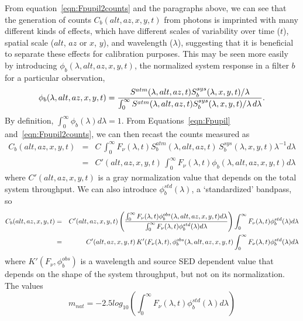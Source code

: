 \documentclass[12pt,preprint]{aastex}
\begin{document}
From equation~\ref{eqn:Fpupil2counts} and the paragraphs above, we can
see that the generation of counts $C_b(alt,az,x,y,t)$ from photons is
imprinted with many different kinds of effects, which have different
scales of variability over time ($t$), spatial scale ($alt$, $az$ or
$x$, $y$), and wavelength ($\lambda$), suggesting that it is
beneficial to separate these effects for calibration
purposes. This may be
seen more easily by introducing $\phi_b(\lambda,alt,az,x,y,t)$, the normalized system
response in a filter $b$ for a particular observation,
\begin{equation}
\label{eqn:PhiDef}
   \phi_b(\lambda,alt,az,x,y,t) = {
     {S^{atm}(\lambda,alt,az,t) S_b^{sys}(\lambda,x,y,t) \slash
       \lambda} \over
     \int_0^\infty { {S^{atm}(\lambda,alt,az,t) 
         S_b^{sys}(\lambda,x,y,t) \slash \lambda} \,d\lambda}}.
\end{equation}
By definition, $\int_0^\infty {\phi_b(\lambda) d\lambda}=1$.  From
Equations~\ref{eqn:Fpupil} and~\ref{eqn:Fpupil2counts}, we can then
recast the counts measured as
\begin{eqnarray}
\label{eqn:fullcounts}
C_b(alt,az,x,y,t) & = & C \, \int_0^\infty {F_\nu(\lambda,t)
  S_b^{atm}(\lambda,alt,az,t) \, S_b^{sys}(\lambda,x,y,t)
  \lambda^{-1}d\lambda} \\
&= & C'(alt,az,x,y,t) \,
     \int_0^\infty {F_\nu(\lambda,t)\phi_b(\lambda,alt,az,x,y,t)
       d\lambda} 
\end{eqnarray}
where $C'(alt,az,x,y,t)$ is a gray normalization value that depends
on the total system throughput. We can also introduce
$\phi_b^{std}(\lambda)$, a `standardized' bandpass, so
\begin{eqnarray}
C_b(alt,az,x,y,t) & = & C'(alt,az,x,y,t)
\left( {\int_0^\infty {F_\nu(\lambda,t)\phi_b^{obs}(\lambda,alt,az,x,y,t) d\lambda} \over 
\int_0^\infty {F_\nu(\lambda,t)\phi_b^{std}(\lambda) d\lambda}} 
\right) \int_0^\infty {F_\nu(\lambda,t)\phi_b^{std}(\lambda)  d\lambda}
\nonumber \\ 
& = & C'(alt,az,x,y,t) \, K'(F_\nu(\lambda,t),
\phi_b^{obs}(\lambda,alt,az,x,y,t) 
\int_0^\infty {F_\nu(\lambda,t)\phi_b^{std}(\lambda)  d\lambda} 
\end{eqnarray}
where $K'(F_\nu, \phi_b^{obs})$ is a wavelength and source SED
dependent value that depends on the shape of the system throughput,
but not on its normalization. The values 
\begin{equation}
\label{eqn:defnatmags}
m_{nat} = -2.5 log_{10} (\int_0^\infty {F_\nu(\lambda,t)\phi_b^{std}(\lambda)  d\lambda})
\end{equation}
\end{document}
